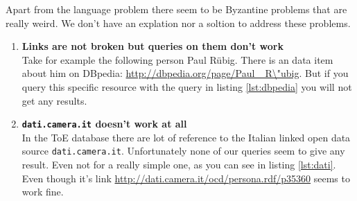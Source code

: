 Apart from the language problem there seem to be Byzantine problems that are really weird. We don't have an explation nor a soltion to address these problems.

\begin{enumerate}
\item \textbf{Links are not broken but queries on them don't work}\\
Take for example the following person Paul Rübig. There is an data item about him on DBpedia:  \url{http://dbpedia.org/page/Paul\_ R\"ubig}. But if you query this specific resource with the query in listing \ref{lst:dbpedia} you will not get any results.


\item \textbf{\texttt{dati.camera.it} doesn't work at all}\\
In the ToE database there are lot of reference to the Italian linked open data source \texttt{dati.camera.it}. Unfortunately none of our queries seem to give any result. Even not for a really simple one, as you can see in listing \ref{lst:dati}. Even though it's link \url{http://dati.camera.it/ocd/persona.rdf/p35360} seems to work fine.


\end{enumerate}